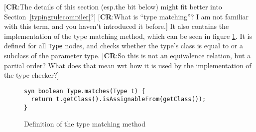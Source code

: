 \documentclass[nofilelist]{cslthse-msc}
\newcommand{\CR}[1]{\textcolor{green!60!black}{[\textbf{CR}:#1]}}
\begin{document}
\CR{The details of this section (esp.\@ the bit below) might fit better into Section~\ref{typingrulecompiler}?}
\CR{What is ``type matching''?  I am not familiar with this term, and you haven't introduced it before.}
It also contains the implementation of the type matching method, which can be seen in figure \ref{typematches}.
It is defined for all \lstinline{Type} nodes, and checks whether the type's class is equal to or a subclass of the parameter type.
\CR{So this is not an equivalence relation, but a partial order?  What does that mean wrt how it is used by the implementation of the type checker?}

\begin{figure}[h]
  \begin{lstlisting}[language=jrag]
syn boolean Type.matches(Type t) {
  return t.getClass().isAssignableFrom(getClass());
}
  \end{lstlisting}
  \caption{Definition of the type matching method}
  \label{typematches}
\end{figure}





\end{document}

